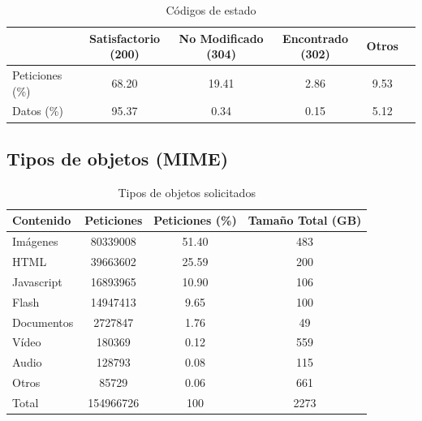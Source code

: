 \documentclass[twocolumn]{Jornadas}
\begin{document}
\begin{table}
\centering
\renewcommand{\baselinestretch}{1.5}
\scriptsize
\begin{tabular}{|l||c|c|c|c|c|} \hline
  & Satisfactorio (200) & No Modificado (304) & Encontrado (302) & Otros\\\hline\hline
Peticiones (\%)    & 68.20  & 19.41 & 2.86 & 9.53            \\\hline  
Datos (\%)        & 95.37   & 0.34 & 0.15 & 5.12             \\\hline 
\end{tabular}
\caption{Códigos de estado}
\label{table:codigos}
\end{table}


\subsection{Tipos de objetos (MIME)}
\label{mime}

\begin{table}
\centering
\renewcommand{\baselinestretch}{1.5}
\scriptsize
\begin{tabular}{|l||c|c|c|} \hline
Contenido   & Peticiones & Peticiones (\%) &Tamaño Total (GB) \\\hline\hline
Imágenes    & 80339008   & 51.40 &483             \\\hline  
HTML        & 39663602   & 25.59 &200             \\\hline 
Javascript  & 16893965   & 10.90 &106             \\\hline 
Flash       & 14947413   & 9.65 & 100              \\\hline 
Documentos  & 2727847    & 1.76 &49              \\\hline
Vídeo       & 180369     & 0.12 & 559             \\\hline 
Audio       & 128793     & 0.08 & 115             \\\hline 
Otros       & 85729      & 0.06 & 661             \\\hline\hline
Total & 154966726 & 100 & 2273 \\\hline
\end{tabular}
\caption{Tipos de objetos solicitados}
\label{table:contenido}
\end{table}
\end{document}
